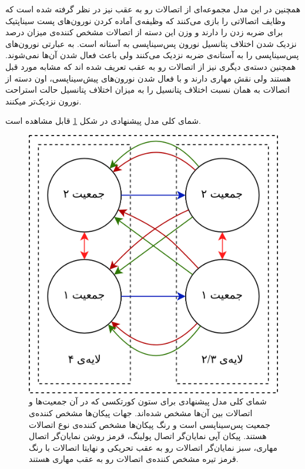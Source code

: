 \documentclass[12pt]{report}
\begin{document}
	همچنین در این مدل مجموعه‌ای از اتصالات رو به عقب نیز در نظر گرفته شده است که وظایف اتصالاتی را بازی می‌کنند که وظیفه‌ی آماده کردن نورون‌های پست سیناپتیک برای ضربه زدن را دارند و وزن این دسته از اتصالات مشخص کننده‌ی میزان درصد نزدیک شدن اختلاف پتانسیل نورون پس‌سیناپسی به آستانه است. به عبارتی نورون‌های پس‌سیناپسی را به آستانه‌ی ضربه نزدیک می‌کنند ولی باعث فعال شدن آن‌ها نمی‌شوند. همچنین دسته‌ی دیگری نیز از اتصالات رو به عقب تعریف شده اند که مشابه مورد قبل هستند ولی نقش مهاری دارند و با فعال شدن نورون‌های پیش‌سیناپسی، اون دسته از اتصالات به همان نسبت اختلاف پتانسیل را به میزان اختلاف پتانسیل حالت استراحت نورون نزدیک‌تر میکنند.
	
	شمای کلی مدل پیشنهادی در شکل \ref{fig:model_cc} قابل مشاهده است. 
	
	\begin{figure}[]
		\centering
		\includegraphics[width=1.0\linewidth]{model_cc.png}
		\caption[NS]{
			شمای کلی مدل پیشنهادی برای ستون کورتکسی که در آن جمعیت‌ها و اتصالات بین آن‌ها مشخص شده‌اند. جهات پیکان‌ها مشخص کننده‌ی جمعیت پس‌سیناپسی است و رنگ پیکان‌ها مشخص کننده‌ی نوع اتصالات هستند. پیکان آپی نمایان‌گر اتصال پولینگ، قرمز روشن نمایان‌گر اتصال مهاری، سبز نمایان‌گر اتصالات رو به عقب تحریکی و نهایتا اتصالات با رنگ قرمز تیره مشخص کننده‌ی اتصالات رو به عقب مهاری هستند.
		}
		\label{fig:model_cc} 
	\end{figure}
	
\end{document}

